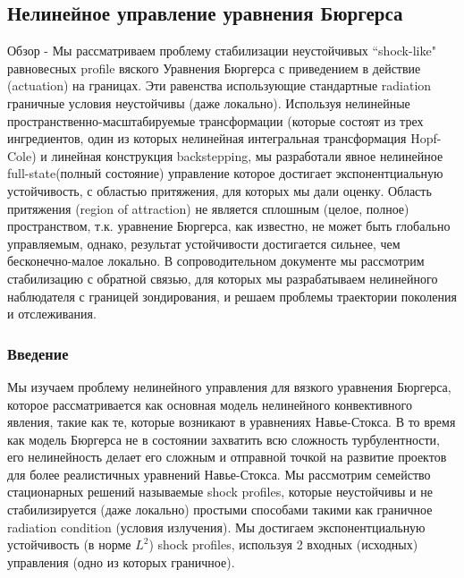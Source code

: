 


\subsection{Нелинейное управление уравнения Бюргерса}

Обзор - Мы рассматриваем проблему стабилизации неустойчивых ``shock-like" равновесных profile вяского Уравнения Бюргерса с приведением в действие (actuation) на границах. Эти равенства использующие стандартные radiation граничные условия неустойчивы (даже локально). Используя нелинейные пространственно-масштабируемые трансформации (которые состоят из трех ингредиентов, один из которых нелинейная интегральная трансформация Hopf-Cole) и линейная конструкция backstepping, мы разработали явное нелинейное full-state(полный состояние) управление которое достигает экспонентциальную устойчивость, с областью притяжения, для которых мы дали оценку. Область притяжения (region of attraction) не является сплошным (целое, полное) пространством, т.к. уравнение Бюргерса, как известно, не может быть глобально управляемым, однако, результат устойчивости достигается сильнее, чем бесконечно-малое локально. В сопроводительном документе мы рассмотрим стабилизацию с обратной связью, для которых мы разрабатываем нелинейного наблюдателя с границей зондирования, и решаем проблемы траектории поколения и отслеживания.

\subsubsection{Введение}

Мы изучаем проблему нелинейного управления для вязкого уравнения Бюргерса, которое рассматривается как основная модель нелинейного конвективного явления, такие как те, которые возникают в уравнениях Навье-Стокса. В то время как модель Бюргерса не в состоянии захватить всю сложность турбулентности, его нелинейность делает его сложным и отправной точкой на развитие проектов для более реалистичных уравнений Навье-Стокса. Мы рассмотрим семейство стационарных решений называемые shock profiles, которые неустойчивы и не стабилизируется (даже локально) простыми способами такими как граничное radiation condition (условия излучения). Мы достигаем экспонентциальную устойчивость (в норме $L^2$) shock profiles, используя 2 входных (исходных) управления  (одно из которых граничное).

